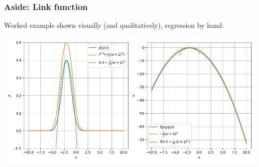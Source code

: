 \documentclass[usenames,dvipsnames,table]{beamer}
\begin{document}
\begin{frame}
\frametitle{Aside: Link function}
\vspace{-1em}
Worked example shown visually (and qualitatively), regression by hand:

\vspace{1em}
\includegraphics[width=\textwidth]{img/link}
\end{frame}
\end{document}
